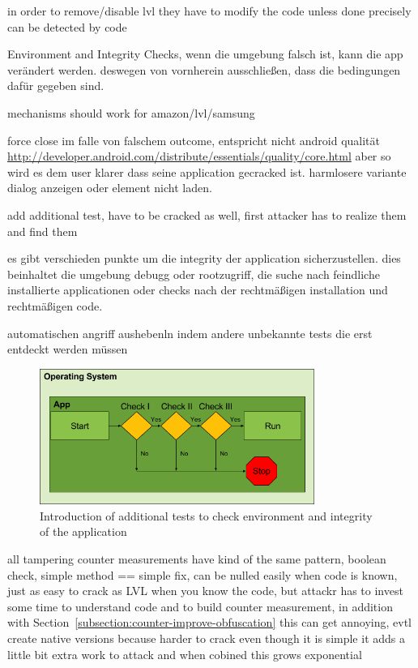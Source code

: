 in order to remove/disable lvl they have to modify the code
unless done precisely can be detected by code
\cite{developersSecuring}

Environment and Integrity Checks, wenn die umgebung falsch ist, kann die app verändert werden. deswegen von vornherein ausschließen, dass die bedingungen dafür gegeben sind.
\cite{munteanLicense}

mechanisms should work for amazon/lvl/samsung

force close im falle von falschem outcome, entspricht nicht android qualität
\url{http://developer.android.com/distribute/essentials/quality/core.html} aber so wird es dem user klarer dass seine application gecracked ist. harmlosere variante dialog anzeigen oder element nicht laden.

add additional test, have to be cracked as well, first attacker has to realize them and find them


es gibt verschieden punkte um die integrity der application sicherzustellen. dies beinhaltet die umgebung debugg oder rootzugriff, die suche nach feindliche installierte applicationen oder checks nach der rechtmäßigen installation und rechtmäßigen code.




automatischen angriff aushebenln indem andere unbekannte tests die erst entdeckt werden müssen

\begin{figure}[h]
    \centering
    \includegraphics[width=0.8\textwidth]{data/verificationNowAdditional.png}
    \caption{Introduction of additional tests to check environment and integrity of the application}
    \label{fig:verificationNowAdditional}
\end{figure}


all tampering counter measurements have kind of the same pattern, boolean check, simple method == simple fix, can be nulled easily when code is known, just as easy to crack as LVL when you know the code, but attackr has to invest some time to understand code and to build counter measurement, in addition with Section~\ref{subsection:counter-improve-obfuscation} this can get annoying, evtl create native versions because harder to crack
even though it is simple it adds a little bit extra work to attack and when cobined this grows exponential

